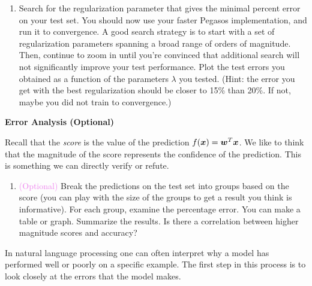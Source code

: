 \documentclass{article}
\newcommand{\nyuparagrah}[1]{\textcolor{nyupurple}{\large #1}}
\theoremstyle{plain}
\theoremstyle{definition}
\begin{document}
\begin{enumerate}
\item Search for the regularization parameter that gives the minimal percent error
on your test set. You should now use your faster Pegasos implementation,
and run it to convergence. A good search strategy is to start with
a set of regularization parameters spanning a broad range of orders
of magnitude. Then, continue to zoom in until you're convinced that
additional search will not significantly improve your test performance.
Plot the test errors you obtained as a function of the parameters $\lambda$ you tested. (Hint: the error you get with the best regularization should be closer to 15\% than 20\%. If not, maybe you did not train to convergence.)\\

\setcounter{saveenum}{\value{enumi}}
\end{enumerate}

\nyuparagrah{\bf Error Analysis {(Optional)}}

Recall that the \emph{score} is the value of the prediction
$f(\boldsymbol{x})=\boldsymbol{w}^{T} \boldsymbol{x}$. We like to think that the magnitude of the score represents
the confidence of the prediction. This is something we can directly
verify or refute.

\begin{enumerate}
  \setcounter{enumi}{\value{saveenum}}
\item  \textcolor{violet}{(Optional)} Break the predictions on the test set into groups based on the score
(you can play with the size of the groups to get a result you think
is informative). For each group, examine the percentage error. You
can make a table or graph. Summarize the results. Is there a correlation
between higher magnitude scores and accuracy?\\


\setcounter{saveenum}{\value{enumi}}
\end{enumerate}

In natural language processing 
one can often interpret why a model has performed well or poorly on
a specific example. The
first step in this process is to look closely at the errors that the
model makes.
\end{document}

